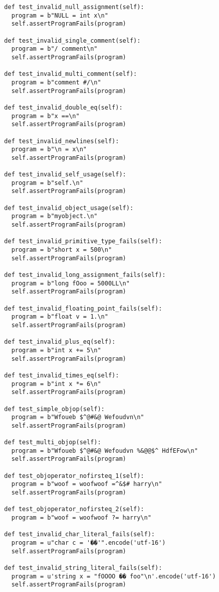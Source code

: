 \documentclass{article}
\begin{document}
\begin{verbatim}
  def test_invalid_null_assignment(self):
    program = b"NULL = int x\n"
    self.assertProgramFails(program)

  def test_invalid_single_comment(self):
    program = b"/ comment\n"
    self.assertProgramFails(program)

  def test_invalid_multi_comment(self):
    program = b"comment #/\n"
    self.assertProgramFails(program)

  def test_invalid_double_eq(self):
    program = b"x ==\n"
    self.assertProgramFails(program)

  def test_invalid_newlines(self):
    program = b"\n = x\n"
    self.assertProgramFails(program)

  def test_invalid_self_usage(self):
    program = b"self.\n"
    self.assertProgramFails(program)

  def test_invalid_object_usage(self):
    program = b"myobject.\n"
    self.assertProgramFails(program)

  def test_invalid_primitive_type_fails(self):
    program = b"short x = 500\n"
    self.assertProgramFails(program)

  def test_invalid_long_assignment_fails(self):
    program = b"long fOoo = 5000LL\n"
    self.assertProgramFails(program)

  def test_invalid_floating_point_fails(self):
    program = b"float v = 1.\n"
    self.assertProgramFails(program)

  def test_invalid_plus_eq(self):
    program = b"int x += 5\n"
    self.assertProgramFails(program)

  def test_invalid_times_eq(self):
    program = b"int x *= 6\n"
    self.assertProgramFails(program)

  def test_simple_objop(self):
    program = b"Wfoueb $^@#&@ Wefoudvn\n"
    self.assertProgramFails(program)

  def test_multi_objop(self):
    program = b"Wfoueb $^@#&@ Wefoudvn %&@@$^ HdfEFow\n"
    self.assertProgramFails(program)

  def test_objoperator_nofirsteq_1(self):
    program = b"woof = woofwoof =^&$# harry\n"
    self.assertProgramFails(program)

  def test_objoperator_nofirsteq_2(self):
    program = b"woof = woofwoof ?= harry\n"

  def test_invalid_char_literal_fails(self):
    program = u"char c = '��'".encode('utf-16')
    self.assertProgramFails(program)

  def test_invalid_string_literal_fails(self):
    program = u'string x = "fOOOO �� foo"\n'.encode('utf-16')
    self.assertProgramFails(program)


\end{verbatim}
\end{document}
